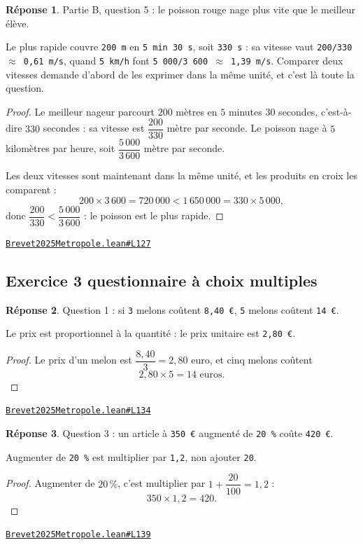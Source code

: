 \documentclass[11pt,a4paper]{article}
\theoremstyle{definition}
\theoremstyle{plain}
\theoremstyle{definition}
\newtheorem*{reponse}{Réponse}
\newcommand{\source}[2]{\par\smallskip\noindent\hfill{\footnotesize\href{#1}{\texttt{#2}}}\par\smallskip}
\begin{document}
\begin{reponse}
Partie B, question 5 : le poisson rouge nage plus vite que le meilleur élève.

Le plus rapide couvre \texttt{200 m} en \texttt{5 min 30 s}, soit \texttt{330 s} : sa vitesse vaut
\texttt{200/330 \(\approx\) 0,61 m/s}, quand \texttt{5 km/h} font \texttt{5 000/3 600 \(\approx\) 1,39 m/s}. Comparer deux
vitesses demande d'abord de les exprimer dans la même unité, et c'est là toute la
question.
\end{reponse}
\begin{proof}
Le meilleur nageur parcourt $200$ mètres en $5$ minutes $30$ secondes, c'est-à-dire
$330$ secondes : sa vitesse est $\dfrac{200}{330}$ mètre par seconde. Le poisson nage à
$5$ kilomètres par heure, soit $\dfrac{5\,000}{3\,600}$ mètre par seconde.

Les deux vitesses sont maintenant dans la même unité, et les produits en croix les
comparent :
\[ 200 \times 3\,600 = 720\,000 < 1\,650\,000 = 330 \times 5\,000 , \]
donc $\dfrac{200}{330} < \dfrac{5\,000}{3\,600}$ : le poisson est le plus rapide.
\end{proof}
\source{https://github.com/Commutator-IO/learn-lean/blob/main/exams/2025/Brevet2025Metropole.lean\#L127}{Brevet2025Metropole.lean\#L127}

\subsection{Exercice 3 \textemdash{} questionnaire à choix multiples}

\begin{reponse}
Question 1 : si \texttt{3} melons coûtent \texttt{8,40 €}, \texttt{5} melons coûtent \texttt{14 €}.

Le prix est proportionnel à la quantité : le prix unitaire est \texttt{2,80 €}.
\end{reponse}
\begin{proof}
Le prix d'un melon est $\dfrac{8{,}40}{3} = 2{,}80$ euro, et cinq melons coûtent
\[ 2{,}80 \times 5 = 14 \text{ euros} . \]
\end{proof}
\source{https://github.com/Commutator-IO/learn-lean/blob/main/exams/2025/Brevet2025Metropole.lean\#L134}{Brevet2025Metropole.lean\#L134}

\begin{reponse}
Question 3 : un article à \texttt{350 €} augmenté de \texttt{20 \%} coûte \texttt{420 €}.

Augmenter de \texttt{20 \%} est multiplier par \texttt{1,2}, non ajouter \texttt{20}.
\end{reponse}
\begin{proof}
Augmenter de $20\,\%$, c'est multiplier par $1 + \dfrac{20}{100} = 1{,}2$ :
\[ 350 \times 1{,}2 = 420 . \]
\end{proof}
\source{https://github.com/Commutator-IO/learn-lean/blob/main/exams/2025/Brevet2025Metropole.lean\#L139}{Brevet2025Metropole.lean\#L139}
\end{document}
